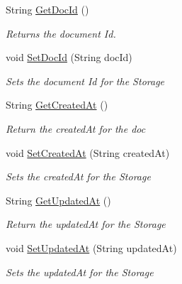 \begin{DoxyCompactItemize}
String \hyperlink{classcom_1_1shephertz_1_1app42_1_1paas_1_1sdk_1_1csharp_1_1user_1_1_user_1_1_j_s_o_n_document_af7e96b6813b7cd8dd82c0d9d46be5f50}{Get\+Doc\+Id} ()
\begin{DoxyCompactList}\small\item\em Returns the document Id. \end{DoxyCompactList}\item 
void \hyperlink{classcom_1_1shephertz_1_1app42_1_1paas_1_1sdk_1_1csharp_1_1user_1_1_user_1_1_j_s_o_n_document_a1ed550247955d30f4e7b3b4e624f7bf2}{Set\+Doc\+Id} (String doc\+Id)
\begin{DoxyCompactList}\small\item\em Sets the document Id for the Storage \end{DoxyCompactList}\item 
String \hyperlink{classcom_1_1shephertz_1_1app42_1_1paas_1_1sdk_1_1csharp_1_1user_1_1_user_1_1_j_s_o_n_document_ab2b96ddec5aa1374c7b2a7ee9ed52b7e}{Get\+Created\+At} ()
\begin{DoxyCompactList}\small\item\em Return the created\+At for the doc \end{DoxyCompactList}\item 
void \hyperlink{classcom_1_1shephertz_1_1app42_1_1paas_1_1sdk_1_1csharp_1_1user_1_1_user_1_1_j_s_o_n_document_a10e458f73b5fd7f8e528146fe08b7c23}{Set\+Created\+At} (String created\+At)
\begin{DoxyCompactList}\small\item\em Sets the created\+At for the Storage \end{DoxyCompactList}\item 
String \hyperlink{classcom_1_1shephertz_1_1app42_1_1paas_1_1sdk_1_1csharp_1_1user_1_1_user_1_1_j_s_o_n_document_ad26d9327f11783a0eeb9795ce5d80d95}{Get\+Updated\+At} ()
\begin{DoxyCompactList}\small\item\em Return the updated\+At for the Storage \end{DoxyCompactList}\item 
void \hyperlink{classcom_1_1shephertz_1_1app42_1_1paas_1_1sdk_1_1csharp_1_1user_1_1_user_1_1_j_s_o_n_document_a6f378498601701ad31a93f018d2a44ca}{Set\+Updated\+At} (String updated\+At)
\begin{DoxyCompactList}\small\item\em Sets the updated\+At for the Storage \end{DoxyCompactList}\item 

\end{DoxyCompactItemize}
